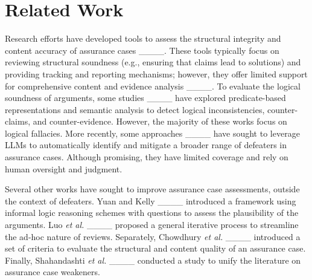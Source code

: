 \section{Related Work}
\label{sec:related}

Research efforts have developed tools to assess the structural integrity and content accuracy of assurance cases ____. These tools typically focus on reviewing structural soundness (e.g., ensuring that claims lead to solutions) and providing tracking and reporting mechanisms; however, they offer limited support for comprehensive content and evidence analysis ____. To evaluate the logical soundness of arguments, some studies ____ have explored predicate-based representations and semantic analysis to detect logical inconsistencies, counter-claims, and counter-evidence.
However, the majority of these works focus on logical fallacies.
More recently, some approaches ____ have sought to leverage LLMs to automatically identify and mitigate a broader range of defeaters in assurance cases. Although promising, they have limited coverage and rely on human oversight and judgment.

Several other works have sought to improve assurance case assessments, outside the context of defeaters. Yuan and Kelly ____ introduced a framework using informal logic reasoning schemes with questions to assess the plausibility of the arguments. Luo \MakeLowercase{\textit{et al.}} ____ proposed a general iterative process to streamline the ad-hoc nature of reviews. Separately, Chowdhury \MakeLowercase{\textit{et al.}} ____ introduced a set of criteria to evaluate the structural and content quality of an assurance case. Finally, Shahandashti \MakeLowercase{\textit{et al.}} ____ conducted a study to unify the literature on assurance case weakeners.